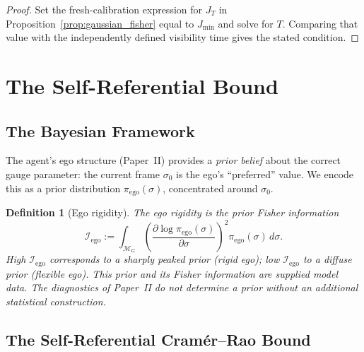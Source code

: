 \documentclass[12pt]{article}
\newtheorem{definition}[theorem]{Definition}
\begin{document}
\begin{proof}
Set the fresh-calibration expression for $J_T$ in
Proposition~\ref{prop:gaussian_fisher} equal to $J_{\min}$ and solve
for $T$.  Comparing that value with the independently defined
visibility time gives the stated condition.
\end{proof}

\section{The Self-Referential Bound}
\label{sec:SRCR}

\subsection{The Bayesian Framework}
\label{subsec:bayesian}

The agent's ego structure (Paper~II) provides a
\emph{prior belief} about the correct gauge parameter:
the current frame $\sigma_0$ is the ego's
``preferred'' value.
We encode this as a prior distribution
$\pi_{\mathrm{ego}}(\sigma)$, concentrated around
$\sigma_0$.

\begin{definition}[Ego rigidity]
\label{def:ego_rigidity}
The \emph{ego rigidity} is the prior Fisher information
\begin{equation}
\label{eq:ego_rigidity}
\mathcal{I}_{\mathrm{ego}}
:= \int_{\mathcal{M}_G}
\left(\frac{\partial \log \pi_{\mathrm{ego}}(\sigma)}
  {\partial \sigma}\right)^{\!2}
\pi_{\mathrm{ego}}(\sigma)\,d\sigma.
\end{equation}
High $\mathcal{I}_{\mathrm{ego}}$ corresponds to a
sharply peaked prior (rigid ego); low
$\mathcal{I}_{\mathrm{ego}}$ to a diffuse prior (flexible
ego).
This prior and its Fisher information are supplied model data.  The
diagnostics of Paper~II do not determine a prior without an additional
statistical construction.
\end{definition}

\subsection{The Self-Referential Cram\'{e}r--Rao Bound}
\label{subsec:SRCR}
\end{document}
